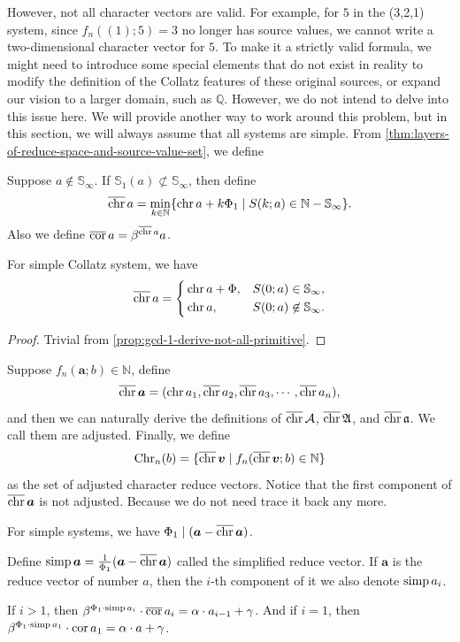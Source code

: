 However, not all character vectors are valid. For example, for $5$ in the (3,2,1) system, since $f_{n}((1);5) = 3$ no longer has source values, we cannot write a two-dimensional character vector for $5$. To make it a strictly valid formula, we might need to introduce some special elements that do not exist in reality to modify the definition of the Collatz features of these original sources, or expand our vision to a larger domain, such as $\mathbb{Q}$. However, we do not intend to delve into this issue here. We will provide another way to work around this problem, but in this section, we will always assume that all systems are simple. From \cref{thm:layers-of-reduce-space-and-source-value-set}, we define
\begin{definition}\label{def:chr-vector}
    Suppose $a\not\in\mathbb{S}_{\infty}$. If $\mathbb{S}_1(a) \not\subset \mathbb{S}_{\infty}$, then define
    \[ \operatorname{\overline{\operatorname{chr}}} a = \min_{k\in\mathbb{N}}\{\operatorname{chr} a + k\Phi_1 \mid S(k;a)\in\mathbb{N} - \mathbb{S}_{\infty}\}. \]
    Also we define $\operatorname{\overline{\operatorname{cor}}} a = \beta^{\operatorname{\overline{\operatorname{chr}}} a}a$.
\end{definition}
\begin{proposition}
    For simple Collatz system, we have
    \[ \operatorname{\overline{\operatorname{chr}}} a = \left\{\begin{aligned}
        & \operatorname{chr} a + \Phi, && S(0;a) \in\mathbb{S}_{\infty}, \\
        & \operatorname{chr} a, && S(0;a) \not\in\mathbb{S}_{\infty}.
    \end{aligned}\right. \]
\end{proposition}
\begin{proof}
    Trivial from \cref{prop:gcd-1-derive-not-all-primitive}.
\end{proof}
\begin{definition}
    Suppose $f_{n}(\bm{a}; b)\in\mathbb{N}$, define
    \[ \operatorname{\overline{\operatorname{chr}}}\bm{a} = (\operatorname{chr} a_1, \operatorname{\overline{\operatorname{chr}}} a_2, \operatorname{\overline{\operatorname{chr}}} a_3, \cdots, \operatorname{\overline{\operatorname{chr}}} a_n), \]
    and then we can naturally derive the definitions of $\operatorname{\overline{\operatorname{chr}}}\mathcal{A}$, $\operatorname{\overline{\operatorname{chr}}}\mathfrak{A}$, and $\operatorname{\overline{\operatorname{chr}}}\mathfrak{a}$. We call them are adjusted.
    Finally, we define
    \[ \operatorname{Chr}_{n}(b) = \{ \operatorname{\overline{\operatorname{chr}}} \bm{v} \mid f_{n}(\operatorname{\overline{\operatorname{chr}}}\bm{v}; b) \in\mathbb{N} \} \]
    as the set of adjusted character reduce vectors. Notice that the first component of $\operatorname{\overline{\operatorname{chr}}}\bm{a}$ is not adjusted. Because we do not need trace it back any more.
\end{definition}

\begin{proposition}
    For simple systems, we have $\Phi_1\mid (\bm{a} - \operatorname{\overline{\operatorname{chr}}}\bm{a})$.
\end{proposition}
\begin{definition}\label{def:simp-vector}
Define $\operatorname{simp}\bm{a} = \frac{1}{\Phi_1}(\bm{a} - \operatorname{\overline{\operatorname{chr}}}\bm{a})$
called the simplified reduce vector. If $\bm{a}$ is the reduce vector of number $a$, then the $i$-th component of it we also denote $\operatorname{simp} a_i$.
\end{definition}
\begin{proposition}\label{prop:rewritten-collatz-rule}
    If $i > 1$, then $\beta^{\Phi_1\cdot\operatorname{simp} a_i}\cdot \operatorname{\overline{\operatorname{cor}}} a_{i} = \alpha \cdot a_{i-1} + \gamma$. And if $i = 1$, then $\beta^{\Phi_1\cdot\operatorname{simp} a_1}\cdot \operatorname{cor} a_{1} = \alpha \cdot a + \gamma$.
\end{proposition}

